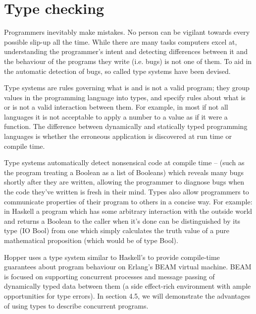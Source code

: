 \section{Type checking}


Programmers inevitably make mistakes. No person can be vigilant towards every possible slip-up all the time. While there are many tasks computers excel at, understanding the programmer’s intent and detecting differences between it and the behaviour of the programs they write (i.e. bugs) is not one of them. To aid in the automatic detection of bugs, so called type systems have been devised.

Type systems are rules governing what is and is not a valid program; they group values in the programming language into types, and specify rules about what is or is not a valid interaction between them. For example, in most if not all languages it is not acceptable to apply a number to a value as if it were a function. The difference between dynamically and statically typed programming languages is whether the erroneous application is discovered at run time or compile time.

Type systems automatically detect nonsensical code at compile time – (such as the program treating a Boolean as a list of Booleans) which reveals many bugs shortly after they are written, allowing the programmer to diagnose bugs when the code they’ve written is fresh in their mind. Types also allow programmers to communicate properties of their program to others in a concise way. For example: in Haskell a program which has some arbitrary interaction with the outside world and returns a Boolean to the caller when it’s done can be distinguished by its type (IO Bool) from one which simply calculates the truth value of a pure mathematical proposition (which would be of type Bool).

Hopper uses a type system similar to Haskell's to provide compile-time guarantees about program behaviour on Erlang's BEAM virtual machine. BEAM is focused on supporting concurrent processes and message passing of dynamically typed data between them (a side effect-rich environment with ample opportunities for type errors). In section 4.5, we will demonstrate the advantages of using types to describe concurrent programs.



